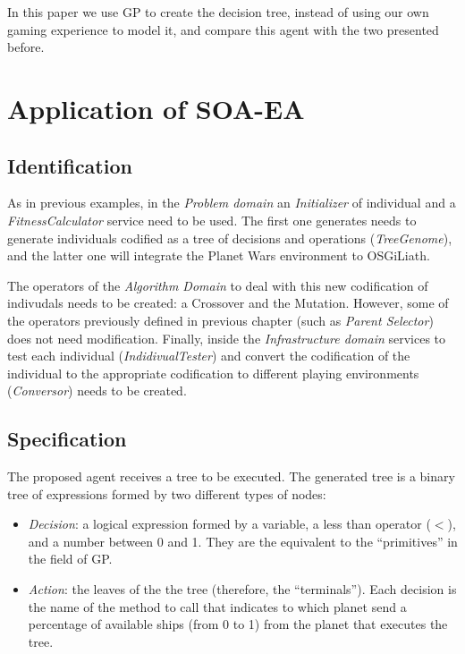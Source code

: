 In this paper we use GP to create the decision tree,
instead of using our own gaming experience to model it, and compare
this agent with the two presented before.  


\section{Application of SOA-EA}

\subsection{Identification}

As in previous examples, in the {\em Problem domain} an {\em Initializer} of individual and a {\em FitnessCalculator} service need to be used. The first one generates needs to generate individuals codified as a tree of decisions and operations ({\em TreeGenome}), and the latter one will integrate the Planet Wars environment to OSGiLiath.

The operators of the {\em Algorithm Domain} to deal with this new codification of indivudals needs to be created: a Crossover and the Mutation. However, some of the operators previously defined in previous chapter (such as {\em Parent Selector}) does not need modification.
Finally, inside the {\em Infrastructure domain} services to test each individual ({\em IndidivualTester}) and convert the codification of the individual to the appropriate codification to different playing environments ({\em Conversor}) needs to be created.

\subsection{Specification}

The proposed agent receives a tree to be executed. The generated tree
is a binary tree of expressions formed by two different types of nodes:

\begin{itemize}
\item {\em Decision}: a logical expression formed by a variable, a less than operator ($<$), and a number between 0 and 1. They are the equivalent to the ``primitives'' in the field of GP.
\item {\em Action}: the leaves of the the tree (therefore, the ``terminals''). Each decision is the name of the method to call that indicates to which planet send a percentage of available ships (from 0 to 1) from the planet that executes the tree. 
\end{itemize}

